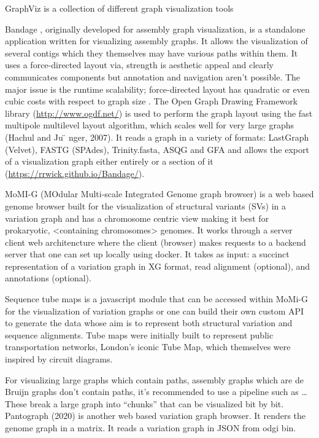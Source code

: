 \documentclass[a4paper]{article}
\begin{document}
GraphViz \cite{northOnlineHierarchicalGraph2002,ellsonGraphvizDynagraphStatic2004}
is a collection of different graph visualization tools 

Bandage \cite{wickBandageInteractiveVisualization2015}, originally developed for 
assembly graph visualization, is a standalone application written for
visualizing assembly graphs.
It allows the visualization of several contigs which they themselves may have
various paths within them.
It uses a force-directed layout via, strength is aesthetic appeal and clearly
communicates components but annotation and navigation aren’t possible.
The major issue is the runtime scalability; force-directed layout has quadratic 
or even cubic costs with respect to graph size .
The Open Graph Drawing Framework library (\url{http://www.ogdf.net/}) is used to
perform the graph layout using the fast multipole multilevel layout algorithm, 
which scales well for very large graphs (Hachul and Ju ̈ nger, 2007).
It reads a graph in a variety of formats: LastGraph (Velvet), FASTG (SPAdes), 
Trinity.fasta, ASQG and GFA and allows the export of a visualization graph
either entirely or a section of it (\url{https://rrwick.github.io/Bandage/}).

MoMI-G \cite{yokoyamaMoMIGModularMultiscale2019}
(MOdular Multi-scale Integrated Genome graph browser) 
is a web based genome browser built for the visualization of structural 
variants (SVs) in a variation graph and has a chromosome centric view making
it best for prokaryotic, <containing chromosomes> genomes. 
It works through a server client web architencture where the client (browser)
makes requests to a backend server that one can set up locally using docker.
It takes as input: a succinct representation of a variation graph in XG format,
read alignment (optional), and annotations (optional).

Sequence tube maps \cite{beyerSequenceTubeMaps2019} is a javascript module that
can be accessed within MoMi-G for the visualization of variation graphs or one
can  build their own custom API to generate the data whose aim is to represent
both structural variation and sequence alignments.
Tube maps were initially built to represent public transportation networks,
London’s iconic Tube Map, \cite{cartwrightamBeckRepresentationLondon2012} which 
themselves were inspired by circuit diagrams.

For visualizing large graphs which contain paths, assembly graphs which are de 
Bruijn graphs don’t contain paths, it’s recommended to use a pipeline such as …
These break a large graph into “chunks” that can be visualized bit by bit. 
Pantograph (2020) is another web based variation graph browser. 
It renders the genome graph in a matrix. It reads a variation graph in JSON from
odgi bin.
\end{document}

